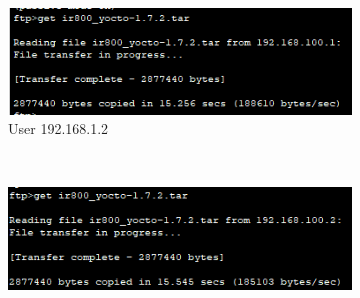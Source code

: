 \begin{figure}[!htb]
\begin{subfigure}{.45\textwidth}
        \includegraphics[width=\textwidth,height=\textwidth,keepaspectratio]{./img/lacp/user2.png}
        \caption{User 192.168.1.2}
    \end{subfigure}
    ~
    \begin{subfigure}{.45\textwidth}
        \includegraphics[width=\textwidth,height=\textwidth,keepaspectratio]{./img/lacp/admin1.png}

\end{subfigure}
\end{figure}
